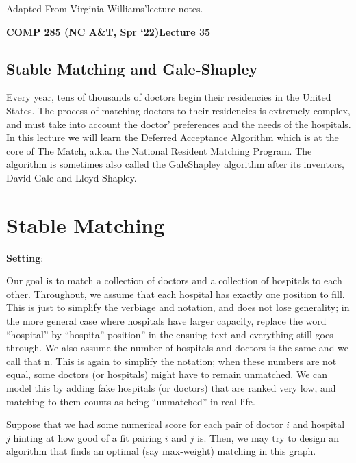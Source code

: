 \documentclass [12pt]{article}
\theoremstyle{definition}
\begin{document}
 

\vspace {1em} 
\begin {Instruction} 
Adapted From Virginia Williams'lecture notes.
\end {Instruction}  

{\LARGE \textbf {COMP 285 (NC A\&T, Spr `22)}\hfill \textbf {Lecture 35} } 

\begin{centering}
\section*{Stable Matching and Gale-Shapley}
\end{centering}
 
Every year, tens of thousands of doctors begin their residencies in the United States. The process of matching doctors to their residencies is extremely complex, and must take into account the doctor' preferences and the needs of the hospitals. In this lecture we will learn the Deferred Acceptance Algorithm which is at the core of The Match, a.k.a. the National Resident Matching Program. The algorithm is sometimes also called the GaleShapley algorithm after its inventors, David Gale and Lloyd Shapley.

\section{Stable Matching}
\textbf{Setting}: 

Our goal is to match a collection of doctors and a collection of hospitals to each other. Throughout, we assume that each hospital has exactly one position to fill. This is just to simplify the verbiage and notation, and does not lose generality; in the more general case where hospitals have larger capacity, replace the word ``hospital'' by ``hospita'' position” in the ensuing text and everything still goes through. We also assume the number of hospitals and doctors is the same and we call that n. This is again to simplify the notation; when these numbers are not equal, some doctors (or hospitals) might have to remain unmatched. We can model this by adding fake hospitals (or doctors) that are ranked very low, and matching to them counts as being ``unmatched'' in real life. 

Suppose that we had some numerical score for each pair of doctor $i$ and hospital $j$ hinting at how good of a fit pairing $i$ and $j$ is. Then, we may try to design an algorithm that finds an optimal (say max-weight) matching in this graph. 
\end{document}
